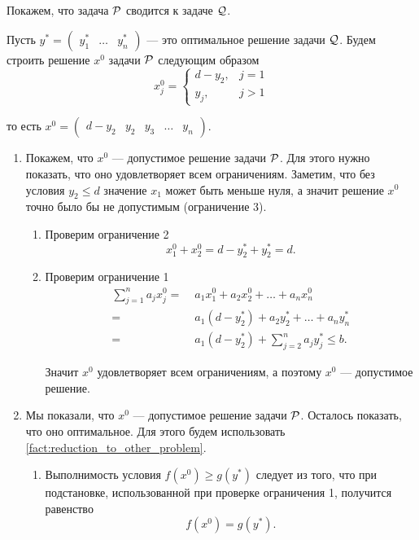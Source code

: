 Покажем, что задача $\P$ сводится к задаче $\Q$.

\prooof

Пусть $y^* = \begin{pmatrix} y^*_1 & \dots & y^*_n \end{pmatrix}$ --- это оптимальное решение задачи $\Q$. Будем строить решение $x^0$ задачи $\P$ следующим образом
\[
x^0_j = \begin{cases}
	d - y_2,& j = 1 \\
	y_j,& j > 1
\end{cases}
\]

то есть $x^0 = \begin{pmatrix} d - y_2 & y_2 & y_3 & \dots & y_n \end{pmatrix}$.

\begin{enumerate}[nosep]
	\item Покажем, что $x^0$ --- допустимое решение задачи $\P$. Для этого нужно показать, что оно удовлетворяет всем ограничениям. Заметим, что без условия $y_2 \le d$ значение $x_1$ может быть меньше нуля, а значит решение $x^0$ точно было бы не допустимым (ограничение 3).
	
	\begin{enumerate}
		\item Проверим ограничение 2
		\[
		x^0_1 + x^0_2 = d - y^*_2 + y^*_2 = d.
		\]
		
		\item Проверим ограничение 1
		\begin{align*}
			\sum_{j=1}^{n} a_j x^0_j =& \; a_1 x^0_1 + a_2 x^0_2 + \dots + a_n x^0_n \\
			=& \; a_1 (d - y^*_2) + a_2 y^*_2 + \dots + a_n y^*_n \\
			=& \; a_1 (d-y^*_2) + \sum_{j=2}^{n}a_j y^*_j \le b.
		\end{align*}
		
		Значит $x^0$ удовлетворяет всем ограничениям, а поэтому $x^0$ --- допустимое решение.	
	\end{enumerate}
	
	\item Мы показали, что $x^0$ --- допустимое решение задачи $\P$. Осталось показать, что оно оптимальное. Для этого будем использовать \cref{fact:reduction_to_other_problem}.
	
	\begin{enumerate}
		\item Выполнимость условия $f(x^0) \ge g(y^*)$ следует из того, что при подстановке, использованной при проверке ограничения 1, получится равенство
		\[
		f(x^0) = g(y^*).
		\]
		

\end{enumerate}
\end{enumerate}
